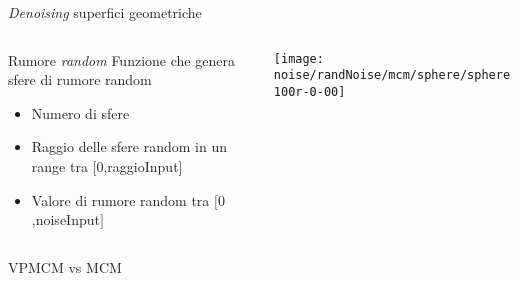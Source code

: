 \begin{frame}{\emph{Denoising} superfici geometriche}
  \begin{columns}[T]
    \begin{column}{4cm}
      \begin{block}{Rumore \emph{random}}
        Funzione che genera sfere di rumore random
        \begin{itemize}
        \item Numero di sfere
        \item Raggio delle sfere random in un range tra $[0$,raggioInput$]$ 
        \item Valore di rumore random tra $[0$,noiseInput$]$
        \end{itemize}
      \end{block}
    \end{column}
   \begin{column}{6cm}
     \texttt{[image: noise/randNoise/mcm/sphere/sphere100r-0-00]}
   \end{column}
  \end{columns}
\end{frame}

\begin{frame}{VPMCM vs MCM}
\begin{columns}[T]
  \begin{column}{5cm}
    \centering
    \end{column}
  \begin{column}[T]{5cm}
    \centering
    \end{column}
 \end{columns}
\begin{columns}[T]
  \begin{column}{5cm}
    \centering
    \end{column}
  \begin{column}[T]{5cm}
    \centering
    \end{column}
  \end{columns}
\end{frame}

